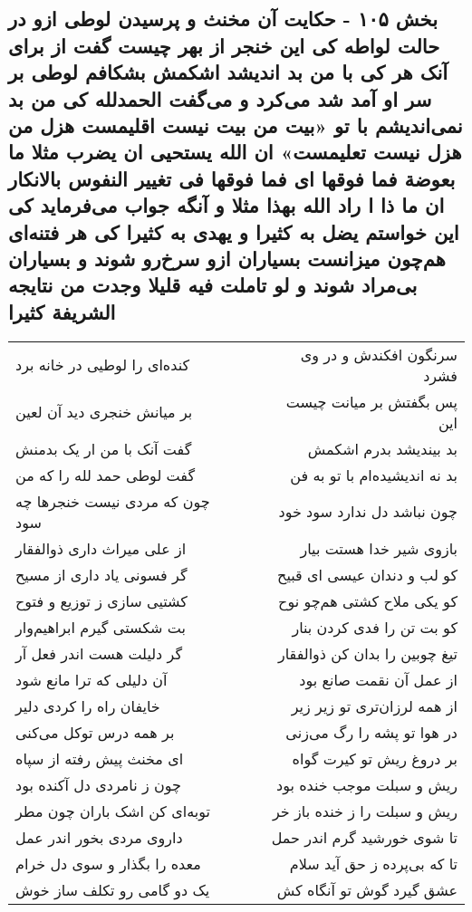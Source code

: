 \begin{center}
\section*{بخش ۱۰۵ - حکایت آن مخنث و پرسیدن لوطی ازو در حالت لواطه کی این خنجر از بهر چیست گفت از برای آنک هر کی با من بد اندیشد  اشکمش بشکافم لوطی بر سر او آمد شد می‌کرد و می‌گفت الحمدلله کی من بد نمی‌اندیشم با تو «بیت من بیت نیست اقلیمست  هزل من هزل نیست تعلیمست» ان الله یستحیی ان یضرب مثلا ما بعوضة فما فوقها ای فما فوقها فی تغییر النفوس بالانکار ان ما ذا ا راد الله بهذا مثلا و آنگه جواب می‌فرماید کی این خواستم یضل به کثیرا و یهدی به کثیرا کی هر فتنه‌ای هم‌چون  میزانست بسیاران ازو سرخ‌رو شوند و بسیاران بی‌مراد شوند و لو  تاملت فیه قلیلا وجدت من نتایجه الشریفة کثیرا}
\label{sec:sh105}
\begin{longtable}{l p{0.5cm} r}
کنده‌ای را لوطیی در خانه برد
&&
سرنگون افکندش و در وی فشرد
\\
بر میانش خنجری دید آن لعین
&&
پس بگفتش بر میانت چیست این
\\
گفت آنک با من ار یک بدمنش
&&
بد بیندیشد بدرم اشکمش
\\
گفت لوطی حمد لله را که من
&&
بد نه اندیشیده‌ام با تو به فن
\\
چون که مردی نیست خنجرها چه سود
&&
چون نباشد دل ندارد سود خود
\\
از علی میراث داری ذوالفقار
&&
بازوی شیر خدا هستت بیار
\\
گر فسونی یاد داری از مسیح
&&
کو لب و دندان عیسی ای قبیح
\\
کشتیی سازی ز توزیع و فتوح
&&
کو یکی ملاح کشتی هم‌چو نوح
\\
بت شکستی گیرم ابراهیم‌وار
&&
کو بت تن را فدی کردن بنار
\\
گر دلیلت هست اندر فعل آر
&&
تیغ چوبین را بدان کن ذوالفقار
\\
آن دلیلی که ترا مانع شود
&&
از عمل آن نقمت صانع بود
\\
خایفان راه را کردی دلیر
&&
از همه لرزان‌تری تو زیر زیر
\\
بر همه درس توکل می‌کنی
&&
در هوا تو پشه را رگ می‌زنی
\\
ای مخنث پیش رفته از سپاه
&&
بر دروغ ریش تو کیرت گواه
\\
چون ز نامردی دل آکنده بود
&&
ریش و سبلت موجب خنده بود
\\
توبه‌ای کن اشک باران چون مطر
&&
ریش و سبلت را ز خنده باز خر
\\
داروی مردی بخور اندر عمل
&&
تا شوی خورشید گرم اندر حمل
\\
معده را بگذار و سوی دل خرام
&&
تا که بی‌پرده ز حق آید سلام
\\
یک دو گامی رو تکلف ساز خوش
&&
عشق گیرد گوش تو آنگاه کش
\\
\end{longtable}
\end{center}
